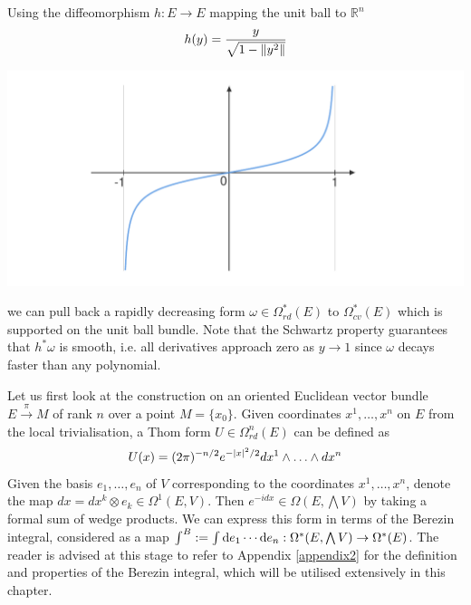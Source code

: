 \hspace{-7mm}
\begin{minipage}{0.5\textwidth}
Using the diffeomorphism $h : E \to E$ mapping the unit ball to $\mathbb{R}^n$
	\[
	h(y) = \frac{y}{\sqrt{1-\norm{y^2}} }
	\] 
\end{minipage}
\begin{minipage}{0.5\textwidth}
		\centering
		\includegraphics[trim={3cm 0 3cm 0},clip,width=\textwidth]{figs/rd_diffeomorphism.pdf}
\end{minipage}
we can pull back a rapidly decreasing form $\omega\in \Omega_{rd}^*(E)$ to 
$\Omega_{cv}^*(E)$ which is supported on the unit ball bundle. 
Note that the Schwartz property guarantees that $h^*\omega$ is smooth, i.e. 
all derivatives approach zero as $y \to 1$ since $\omega$ decays faster than any
polynomial.


Let us first look at the construction on an oriented Euclidean vector bundle
$E\xrightarrow{\pi} M$ of rank $n$ over a point $M=\{x_0\}$. 
Given coordinates $x^1,\ldots,x^n$ on $E$ from the local trivialisation,
a Thom form $U\in \Omega^n_{rd}(E)$ can be defined as
\[
	U(x) = (2\pi)^{-n/2}e^{-\abs{x}^2 /2} dx^1\wedge \ldots\wedge dx^n
\] 
Given the basis $e_1,\ldots,e_n$ of  $V$ corresponding to the coordinates
$x^1,\ldots,x^n$, denote the map $dx = dx^k \otimes e_k \in 
\Omega^1(E, V)$. Then $e^{-idx}\in \Omega(E,\bigwedge V)$ by taking a formal sum
of wedge products.
We can express this form in terms of the Berezin integral,
considered as a map $\int^B := \int \odif{e_1}\cdots\odif{e_n} 
: \Omega^*(E,\bigwedge V) \to \Omega^*(E)$. The reader is advised at this stage
to refer to Appendix \ref{appendix2} for the definition and properties of the 
Berezin integral, which will be utilised extensively in this chapter. 

